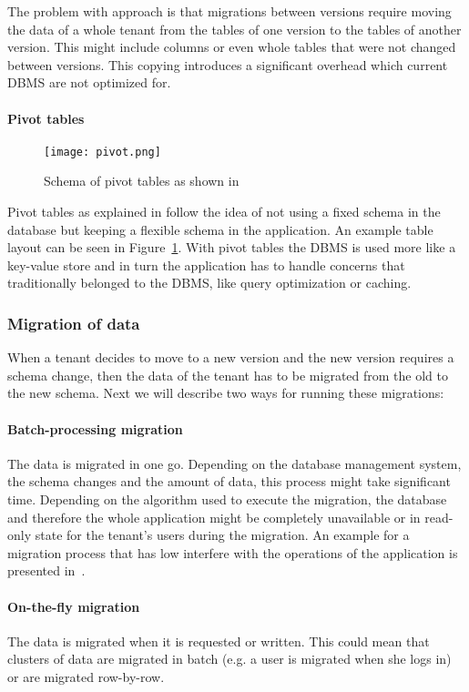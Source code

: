 The problem with approach is that migrations between versions require moving the data of a whole tenant from the tables of one version to the tables of another version. This might include columns or even whole tables that were not changed between versions. This copying introduces a significant overhead which  current DBMS are not optimized for.

%

\paragraph{Pivot tables}

\begin{figure}
\centering
\texttt{[image: pivot.png]}
\caption{Schema of pivot tables as shown in \cite{Yaish2011}}
\label{fig:pivot}
\end{figure}

Pivot tables as explained in \cite{Yaish2011} \cite{Aulbach2011} \cite{Weissman2009} follow the idea of not using a fixed schema in the database but keeping a flexible schema in the application. An example table layout can be seen in Figure~\ref{fig:pivot}. With pivot tables the DBMS is used more like a key-value store and in turn the application has to handle concerns that traditionally belonged to the DBMS, like query optimization or caching.

\subsubsection{Migration of data}

When a tenant decides to move to a new version and the new version requires a schema change, then the data of the tenant has to be migrated from the old to the new schema. Next we will describe two ways for running these migrations:

\paragraph{Batch-processing migration} The data is migrated in one go. Depending on the database management system, the schema changes and the amount of data, this process might take significant time. Depending on the algorithm used to execute the migration, the database and therefore the whole application might be completely unavailable or in read-only state for the tenant's users during the migration. An example for a migration process that has low interfere with the operations of the application is presented in~\cite{Keddo}.

\paragraph{On-the-fly migration} The data is migrated when it is requested or written. This could mean that clusters of data are migrated in batch (e.g. a user is migrated when she logs in) or are migrated row-by-row.

